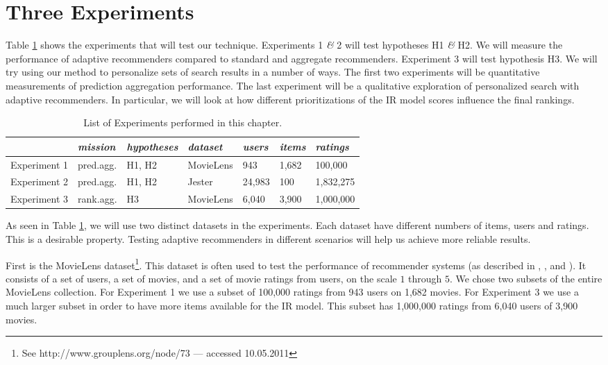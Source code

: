 \section{Three Experiments}

Table \ref{table:experiments} shows the experiments that will test our technique.
Experiments 1 \emph{\&} 2 will test hypotheses H1 \emph{\&} H2.
We will measure the performance of adaptive recommenders compared to standard and aggregate recommenders.
Experiment 3 will test hypothesis H3.
We will try using our method to personalize sets of search results in a number of ways.
The first two experiments will be quantitative measurements of prediction aggregation performance.
The last experiment will be a qualitative exploration of personalized search with adaptive recommenders.
In particular, we will look at how different prioritizations of the IR model scores influence the final rankings.

\vspace{1em}
\begin{table}[h]
  \begin{tabular*}{\textwidth}{ l l l l l l l }
    \toprule
      ~ & 
      \emph{mission} &
      \emph{hypotheses} &
      \emph{dataset} &
      \emph{users} &
      \emph{items} &
      \emph{ratings} \\
    \midrule
    
    Experiment 1 &
    pred.agg. &
    H1, H2 &
    MovieLens &
    943 &
    1,682 &
    100,000 \\
    
    Experiment 2 &
    pred.agg. &
    H1, H2 &
    Jester &
    24,983 &
    100 &
    1,832,275 \\

    Experiment 3 &
    rank.agg. &
    H3 &
    MovieLens &
    6,040 &
    3,900 &
    1,000,000 \\
    
    \bottomrule 
  \end{tabular*}
  \caption[List of Experiments]{List of Experiments performed in this chapter.}
  \label{table:experiments}
\end{table}

\noindent
As seen in Table \ref{table:experiments}, 
we will use two distinct datasets in the experiments.
Each dataset have different numbers of items, users and ratings.
This is a desirable property.
Testing adaptive recommenders in different scenarios
will help us achieve more reliable results.

First is the MovieLens dataset\footnote{
See http://www.grouplens.org/node/73 --- accessed 10.05.2011}.
This dataset is often used to test the performance of recommender systems
(as described in 
\citet[p.9]{Alshamri2008}, \citet[p.4]{Lemire2005}, \citet[p.1]{Adomavicius2005} and \citet[p.2]{Herlocker2004}).
It consists of a set of users, a set of movies, and a set of movie ratings from users,
on the scale $1$ through $5$.
We chose two subsets of the entire MovieLens collection.
For Experiment 1 we use a subset of 100,000 ratings from 943 users on 1,682 movies.
For Experiment 3 we use a much larger subset in order to
have more items available for the IR model.
This subset has 1,000,000 ratings from 6,040 users of 3,900 movies.

